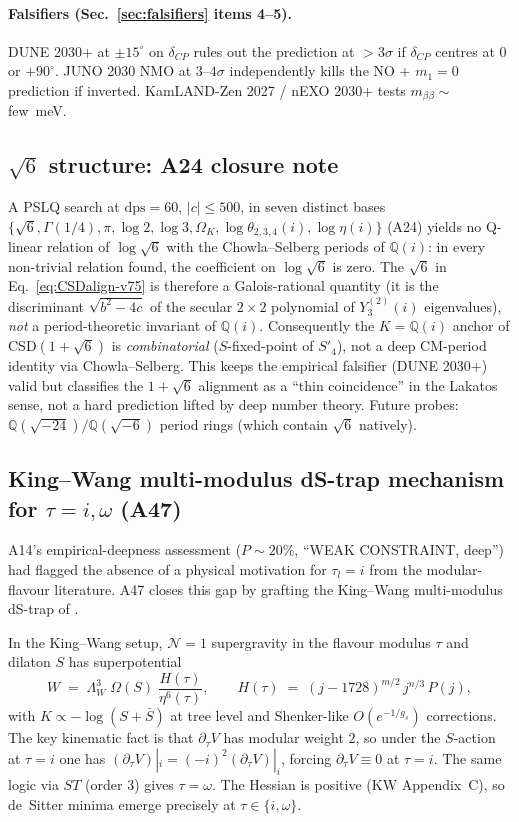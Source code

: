 \documentclass[a4paper,11pt]{article}
\newcommand{\Spf}{S'_4}
\newcommand{\OmK}{\Omega_K}
\newcommand{\Qi}{\mathbb{Q}(i)}
\theoremstyle{definition}
\theoremstyle{remark}
\begin{document}
\paragraph{Falsifiers (Sec.~\ref{sec:falsifiers} items 4--5).}
DUNE 2030+ at $\pm 15^{\circ}$ on $\delta_{CP}$ rules out the
prediction at $>3\sigma$ if $\delta_{CP}$ centres at $0$ or
$+90^{\circ}$.  JUNO 2030 NMO at $3$--$4\sigma$ \cite{JUNO22}
independently kills the NO + $m_1=0$ prediction if inverted.
KamLAND-Zen 2027 / nEXO 2030+ tests $m_{\beta\beta}\sim$ few~meV.

\subsection{$\sqrt{6}$ structure: A24 closure note}
\label{sec:sqrt6}

A PSLQ search at $\mathrm{dps}=60$, $|c|\le 500$, in seven
distinct bases $\{\sqrt 6,\Gamma(1/4),\pi,\log 2,\log 3,\OmK,
\log\theta_{2,3,4}(i),\log\eta(i)\}$ (A24) yields no Q-linear
relation of $\log\sqrt 6$ with the Chowla--Selberg periods of
$\Qi$: in every non-trivial relation found, the coefficient on
$\log\sqrt 6$ is zero.  The $\sqrt 6$ in
Eq.~\eqref{eq:CSDalign-v75} is therefore a Galois-rational
quantity (it is the discriminant $\sqrt{b^2-4c}$ of the secular
$2\times 2$ polynomial of $Y_3^{(2)}(i)$ eigenvalues),
\emph{not} a period-theoretic invariant of $\Qi$.  Consequently
the $K=\Qi$ anchor of CSD$(1+\sqrt 6)$ is \emph{combinatorial}
($S$-fixed-point of $\Spf$), not a deep CM-period identity via
Chowla--Selberg.  This keeps the empirical falsifier (DUNE
2030+) valid but classifies the $1+\sqrt 6$ alignment as a
``thin coincidence'' in the Lakatos sense, not a hard prediction
lifted by deep number theory.  Future probes:
$\mathbb{Q}(\sqrt{-24})/\mathbb{Q}(\sqrt{-6})$ period rings
(which contain $\sqrt 6$ natively).

\subsection{King--Wang multi-modulus dS-trap mechanism for
            $\tau=i,\omega$ (A47)}
\label{sec:KW}

A14's empirical-deepness assessment ($P\sim 20\%$, ``WEAK
CONSTRAINT, deep'') had flagged the absence of a physical
motivation for $\tau_l=i$ from the modular-flavour literature.
A47 closes this gap by grafting the King--Wang multi-modulus
dS-trap of \cite{KW23}.

In the King--Wang setup, $\mathcal{N}=1$ supergravity in the
flavour modulus $\tau$ and dilaton $S$ has superpotential
\[
  W \;=\; \Lambda_W^{3}\;\Omega(S)\;
            \frac{H(\tau)}{\eta^{6}(\tau)} ,\qquad
  H(\tau) \;=\; (j-1728)^{m/2}\,j^{n/3}\,P(j),
\]
with $K\propto -\log(S+\bar S)$ at tree level and Shenker-like
$O(e^{-1/g_s})$ corrections.  The key kinematic fact is that
$\partial_\tau V$ has modular weight $2$, so under the $S$-action
at $\tau=i$ one has
$(\partial_\tau V)|_i = (-i)^{2}(\partial_\tau V)|_i$,
forcing $\partial_\tau V \equiv 0$ at $\tau=i$.  The same logic
via $ST$ (order 3) gives $\tau=\omega$.  The Hessian is
positive (KW Appendix~C), so de~Sitter minima emerge precisely
at $\tau\in\{i,\omega\}$.
\end{document}
